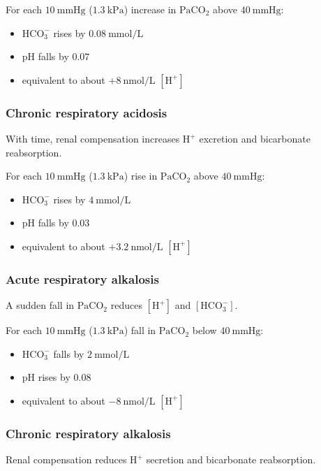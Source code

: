 \documentclass[11pt,a4paper]{article}
\begin{document}
For each \(10~\mathrm{mmHg}\) (\(1.3~\mathrm{kPa}\)) increase in \(\mathrm{PaCO_2}\) above \(40~\mathrm{mmHg}\):
\begin{itemize}
  \item \(\mathrm{HCO_3^-}\) rises by \(0.08~\mathrm{mmol/L}\)
  \item pH falls by \(0.07\)
  \item equivalent to about \(+8~\mathrm{nmol/L}\) \([\mathrm{H^+}]\)
\end{itemize}

\subsubsection{Chronic respiratory acidosis}
With time, renal compensation increases \(\mathrm{H^+}\) excretion and bicarbonate reabsorption.

For each \(10~\mathrm{mmHg}\) (\(1.3~\mathrm{kPa}\)) rise in \(\mathrm{PaCO_2}\) above \(40~\mathrm{mmHg}\):
\begin{itemize}
  \item \(\mathrm{HCO_3^-}\) rises by \(4~\mathrm{mmol/L}\)
  \item pH falls by \(0.03\)
  \item equivalent to about \(+3.2~\mathrm{nmol/L}\) \([\mathrm{H^+}]\)
\end{itemize}

\subsubsection{Acute respiratory alkalosis}
A sudden fall in \(\mathrm{PaCO_2}\) reduces \([\mathrm{H^+}]\) and \([\mathrm{HCO_3^-}]\).

For each \(10~\mathrm{mmHg}\) (\(1.3~\mathrm{kPa}\)) fall in \(\mathrm{PaCO_2}\) below \(40~\mathrm{mmHg}\):
\begin{itemize}
  \item \(\mathrm{HCO_3^-}\) falls by \(2~\mathrm{mmol/L}\)
  \item pH rises by \(0.08\)
  \item equivalent to about \(-8~\mathrm{nmol/L}\) \([\mathrm{H^+}]\)
\end{itemize}

\subsubsection{Chronic respiratory alkalosis}
Renal compensation reduces \(\mathrm{H^+}\) secretion and bicarbonate reabsorption.
\end{document}

